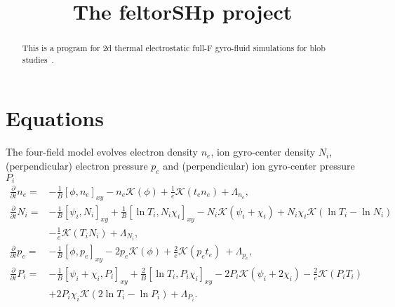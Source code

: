 





\title{The feltorSHp project}
\maketitle

\begin{abstract}
    This is a program for 2d thermal electrostatic full-F gyro-fluid simulations for blob studies~\cite{Held2016b}.
\end{abstract}

\section{Equations}
The four-field model evolves electron density 
\(n_e\), ion gyro-center density \(N_i\), (perpendicular) electron pressure \(p_e\) and (perpendicular) ion gyro-center pressure \(P_i\)
\begin{align}
\label{eq:dtne}
\frac{\partial}{\partial t} n_e =&-
\frac{1}{B} \left[\phi,n_e \right]_{x y} - n_e \mathcal{K}\left(\phi \right) + \frac{1}{e} \mathcal{K}\left(t_{e} n_e \right) +  \Lambda_{n_e}, 
 \\
\label{eq:dtNi}
\frac{\partial}{\partial t} N_i =&
-\frac{1}{B} \left[\psi_i,N_i \right]_{x y} 
+\frac{1}{B} \left[\ln T_{i},N_i \chi_i \right]_{x y} - N_i \mathcal{K}\left(\psi_i + \chi_i\right) 
+ N_i \chi_i \mathcal{K}\left(\ln T_{i} -  \ln N_i \right) \nonumber \\ 
&
- \frac{1}{e} \mathcal{K}\left(T_{i} N_i \right) 
+  \Lambda_{N_i} , \\
\label{eq:dtpe}
     \frac{\partial }{\partial t}   p_e  =&
          -  \frac{1}{B} \left[\phi ,p_e\right]_{xy}  
          - 2 p_e \mathcal{K}(\phi ) 
          + \frac{2 }{e}\mathcal{K}(p_e t_e )\
          + \Lambda_{p_e}  ,
   \\
   \label{eq:dtPi}
     \frac{\partial }{\partial t}   P_i  =&
          -  \frac{1}{B} \left[\psi_i + \chi_i,P_i\right]_{xy} 
          + \frac{2}{B} \left[\ln T_i, P_i \chi_i \right]_{xy}  - 2 P_i \mathcal{K}(\psi_i + 2\chi_i) 
          - \frac{2 }{e}\mathcal{K}(P_i T_i )\nonumber \\ 
         &+2 P_i \chi_i \mathcal{K}(2\ln T_i - \ln P_i )   
          + \Lambda_{P_i}  .
\end{align}
